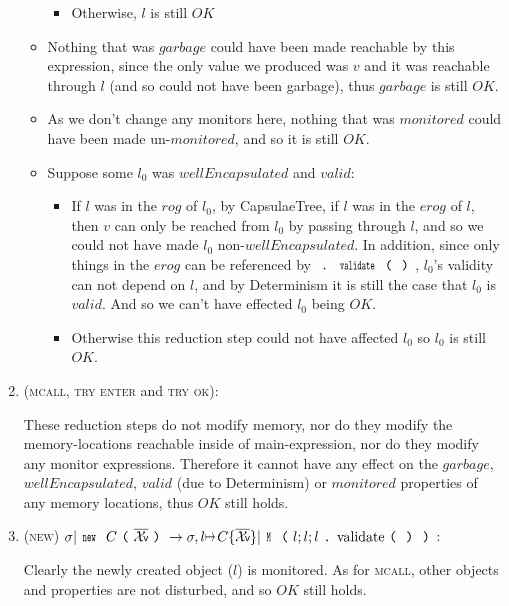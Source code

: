 \begin{enumerate}
\begin{itemize}
\begin{itemize}
		    \item Otherwise, $l$ is still $OK$
    	\end{itemize}

		\item Nothing that was $\mathit{garbage}$ could have been made reachable by this expression, since the only value we produced was $v$ and it was reachable through $l$ (and so could not have been garbage), thus $garbage$ is still $OK$.
		
		\item As we don’t change any monitors here, nothing that was $monitored$ could have been made un-$monitored$, and so it is still $OK$.
		
		\item Suppose some $l_0$ was $wellEncapsulated$ and $valid$:
		\begin{itemize}
			\item If $l$ was in the $rog$ of $l_0$, by CapsulaeTree, if $l$ was in the $erog$ of $l$, then $v$ can only be reached from $l_0$ by passing through $l$, and so we could not have made $l_0$ non-$wellEncapsulated$. In addition, since only things in the $erog$ can be referenced by $\singleDot\Kw{validate}\oR\cR$, $l_0$’s validity can not depend on $l$, and by Determinism it is still the case that $l_0$ is $valid$. And so we can’t have effected $l_0$ being $OK$.
			\item Otherwise this reduction step could not have affected $l_0$ so $l_0$ is still $OK$.
		\end{itemize}
\end{itemize}

\item (\textsc{mcall}, \textsc{try enter} and \textsc{try ok}):

	These reduction steps do not modify memory, nor do they modify the memory-locations reachable inside of main-expression, nor do they modify any monitor expressions. Therefore it cannot have any effect on the $garbage$, $wellEncapsulated$, $valid$ (due to Determinism) or $monitored$ properties of any memory locations, thus $\mathit{OK}$ still holds.

\item (\textsc{new}) $\sigma|\Kw{new}\ C\oR\vs\cR\rightarrow \sigma,l\mapsto C\{\vs\}| \Kw{M}\oR l;l;l\singleDot\text{validate}\oR\cR\cR$:

	Clearly the newly created object ($l$) is monitored. As for \textsc{mcall}, other objects and properties are not disturbed, and so $\mathit{OK}$ still holds.



\end{enumerate}
